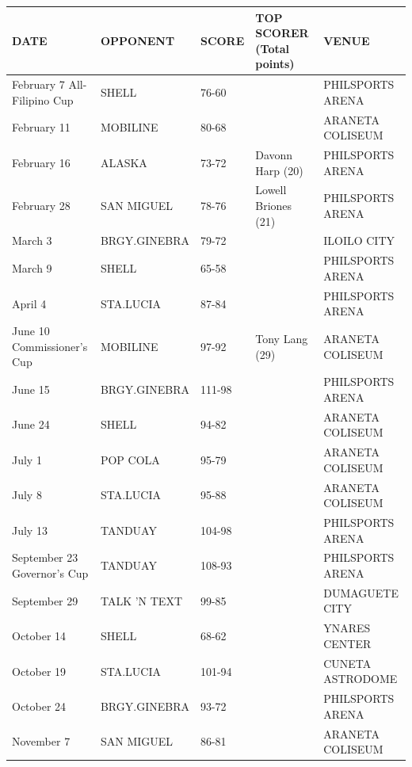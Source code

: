 \documentclass{article}
\begin{document}
\begin{tabular}{lllll}
\toprule
DATE & OPPONENT & SCORE & TOP SCORER (Total points) & VENUE \\
\midrule
February 7 All-Filipino Cup & SHELL & 76-60 &  & PHILSPORTS ARENA \\
February 11 & MOBILINE & 80-68 &  & ARANETA COLISEUM \\
February 16 & ALASKA & 73-72 & Davonn Harp (20) & PHILSPORTS ARENA \\
February 28 & SAN MIGUEL & 78-76 & Lowell Briones (21) & PHILSPORTS ARENA \\
March 3 & BRGY.GINEBRA & 79-72 &  & ILOILO CITY \\
March 9 & SHELL & 65-58 &  & PHILSPORTS ARENA \\
April 4 & STA.LUCIA & 87-84 &  & PHILSPORTS ARENA \\
June 10 Commissioner's Cup & MOBILINE & 97-92 & Tony Lang (29) & ARANETA COLISEUM \\
June 15 & BRGY.GINEBRA & 111-98 &  & PHILSPORTS ARENA \\
June 24 & SHELL & 94-82 &  & ARANETA COLISEUM \\
July 1 & POP COLA & 95-79 &  & ARANETA COLISEUM \\
July 8 & STA.LUCIA & 95-88 &  & ARANETA COLISEUM \\
July 13 & TANDUAY & 104-98 &  & PHILSPORTS ARENA \\
September 23 Governor's Cup & TANDUAY & 108-93 &  & PHILSPORTS ARENA \\
September 29 & TALK 'N TEXT & 99-85 &  & DUMAGUETE CITY \\
October 14 & SHELL & 68-62 &  & YNARES CENTER \\
October 19 & STA.LUCIA & 101-94 &  & CUNETA ASTRODOME \\
October 24 & BRGY.GINEBRA & 93-72 &  & PHILSPORTS ARENA \\
November 7 & SAN MIGUEL & 86-81 &  & ARANETA COLISEUM \\
\bottomrule
\end{tabular}
\end{document}
